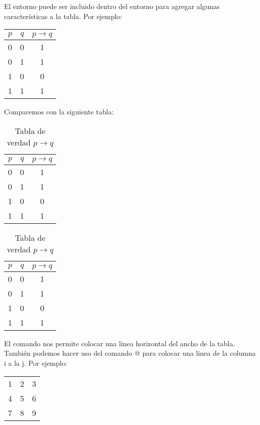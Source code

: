 \documentclass[letterpaper,12pt]{book}
\begin{document}
El entorno \verb@tabular@ puede ser incluido dentro del entorno
\verb@table@ para agregar algunas características a la tabla.
Por ejemplo:

\begin{table}
\begin{tabular}{|c|c|c|} \hline
$p$ & $q$ & $p \rightarrow q$\\\hline
0 & 0 & 1 \\
0 & 1 & 1 \\
1 & 0 & 0 \\
1 & 1 & 1 \\\hline
\end{tabular}
\end{table}

Comparemos con la siguiente tabla:

\begin{table}[h!]
\centering
\begin{tabular}{|c|c|c|} \hline
$p$ & $q$ & $p \rightarrow q$\\\hline
0 & 0 & 1 \\
0 & 1 & 1 \\
1 & 0 & 0 \\
1 & 1 & 1 \\\hline
\end{tabular}
\caption{Tabla de verdad $p \rightarrow q$}
\end{table}

\begin{table}[h!]
\centering
\caption{Tabla de verdad $p \rightarrow q$}
\begin{tabular}{|c|c|c|} \hline
$p$ & $q$ & $p \rightarrow q$\\\hline
0 & 0 & 1 \\
0 & 1 & 1 \\
1 & 0 & 0 \\
1 & 1 & 1 \\\hline
\end{tabular}
\end{table}

El comando \verb@\hline@ nos permite colocar una linea horizontal
del ancho de la tabla. También podemos hacer uso del comando
\verb@{}@ para colocar una linea de la columna i a la j.
Por ejemplo:

\begin{table}[h!]
\centering
\begin{tabular}{| l | c | r | }
	\hline
   1 & 2 & 3 \\
   \cline{1-2}
   4 & 5 & 6 \\
   \cline{2-2}
   7 & 8 & 9 \\
   \hline
 \end{tabular}
\end{table}
\end{document}

